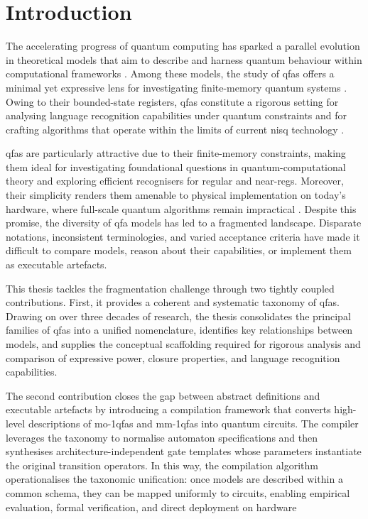 \chapter{Introduction}
\label{chap:introduction}

The accelerating progress of quantum computing has sparked a parallel evolution in theoretical models that aim to describe and harness quantum behaviour within computational frameworks \cite{deutsch1985quantum}. Among these models, the study of \glspl{qfa} offers a minimal yet expressive lens for investigating finite-memory quantum systems \cite{ambainis19981,moore2000quantum}. Owing to their bounded-state registers, \glspl{qfa} constitute a rigorous setting for analysing language recognition capabilities under quantum constraints and for crafting algorithms that operate within the limits of current \gls{nisq} technology \cite{Preskill2018nisq}.

\Glspl{qfa} are particularly attractive due to their finite-memory constraints, making them ideal for investigating foundational questions in quantum-computational theory and exploring efficient recognisers for regular and near-\gls{reg}s. Moreover, their simplicity renders them amenable to physical implementation on today's hardware, where full-scale quantum algorithms remain impractical \cite{Arute2019supremacy}. Despite this promise, the diversity of \gls{qfa} models has led to a fragmented landscape. Disparate notations, inconsistent terminologies, and varied acceptance criteria have made it difficult to compare models, reason about their capabilities, or implement them as executable artefacts.

This thesis tackles the fragmentation challenge through two tightly coupled contributions. First, it provides a coherent and systematic taxonomy of \glspl{qfa}. Drawing on over three decades of research, the thesis consolidates the principal families of \glspl{qfa} into a unified nomenclature, identifies key relationships between models, and supplies the conceptual scaffolding required for rigorous analysis and comparison of expressive power, closure properties, and language recognition capabilities.

The second contribution closes the gap between abstract definitions and executable artefacts by introducing a compilation framework that converts high-level descriptions of \glspl{mo-1qfa} and \glspl{mm-1qfa} into quantum circuits. The compiler leverages the taxonomy to normalise automaton specifications and then synthesises architecture-independent gate templates whose parameters instantiate the original transition operators. In this way, the compilation algorithm operationalises the taxonomic unification: once models are described within a common schema, they can be mapped uniformly to circuits, enabling empirical evaluation, formal verification, and direct deployment on hardware

